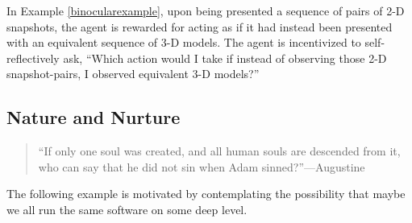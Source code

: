 \documentclass[runningheads]{llncs}
\begin{document}
In Example \ref{binocularexample}, upon being presented a sequence of pairs of 2-D snapshots,
the agent is rewarded for acting as if it had instead been presented with an equivalent
sequence of 3-D models.
The agent is incentivized to self-reflectively ask, ``Which action would I take if instead
of observing those 2-D snapshot-pairs, I observed equivalent 3-D models?''

\subsection{Nature and Nurture}

\begin{quote}
    ``If only one soul was created, and all human souls are descended from it,
    who can say that he did not sin when Adam sinned?''---Augustine \cite{augustine1993free}
\end{quote}

The following example is motivated by contemplating the possibility that maybe we all
run the same software on some deep level.
\end{document}

